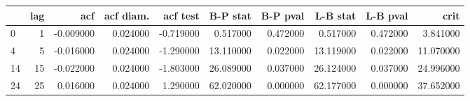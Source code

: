 \begin{tabular}{lrrrrrrrrr}
\toprule
 & lag & acf & acf diam. & acf test & B-P stat & B-P pval & L-B stat & L-B pval & crit \\
\midrule
0 & 1 & -0.009000 & 0.024000 & -0.719000 & 0.517000 & 0.472000 & 0.517000 & 0.472000 & 3.841000 \\
4 & 5 & -0.016000 & 0.024000 & -1.290000 & 13.110000 & 0.022000 & 13.119000 & 0.022000 & 11.070000 \\
14 & 15 & -0.022000 & 0.024000 & -1.803000 & 26.089000 & 0.037000 & 26.124000 & 0.037000 & 24.996000 \\
24 & 25 & 0.016000 & 0.024000 & 1.290000 & 62.020000 & 0.000000 & 62.177000 & 0.000000 & 37.652000 \\
\bottomrule
\end{tabular}
